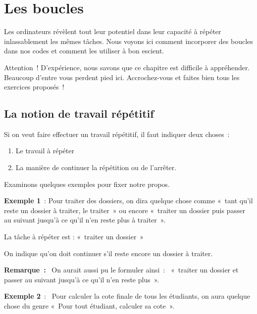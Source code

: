 \chapter{Les boucles}
\label{chap:bcl}

	Les ordinateurs révèlent tout leur potentiel dans leur capacité à
	répéter inlassablement les mêmes tâches.
	Nous voyons ici comment incorporer des boucles dans nos codes 
	et comment les utiliser à bon escient.

	Attention~! 
	D’expérience, nous savons que ce chapitre est difficile à appréhender. 
	Beaucoup d’entre vous perdent pied ici. 
	Accrochez-vous et faites bien tous les exercices proposés~!

\section{La notion de travail répétitif}

	Si on veut faire effectuer un travail répétitif, 
	il faut indiquer deux choses~:
	
	\begin{enumerate}
	\item Le travail à répéter
	\item La manière de continuer la répétition ou de l’arrêter.
	\end{enumerate}

	Examinons quelques exemples pour fixer notre propos.

	\textbf{Exemple 1}~: 
	Pour traiter des dossiers, 
	on dira quelque chose comme 
	«~tant qu’il reste un dossier à traiter, le traiter~» 
	ou encore 
	«~traiter un dossier puis passer au suivant jusqu’à ce qu’il n’en reste plus à traiter~».

	\begin{liste}
	\item La tâche à répéter est : «~traiter un dossier~»
	\item On indique qu’on doit continuer s’il reste encore un dossier à traiter.
	\end{liste}

	\textbf{Remarque~:}~
	On aurait aussi pu le formuler ainsi~:~
	«~traiter un dossier et passer au suivant jusqu’à ce qu’il n’en reste plus~».

	\textbf{Exemple 2}~:~
	Pour calculer la cote finale de tous les étudiants,
	on aura quelque chose du genre 
	«~Pour tout étudiant, calculer sa cote~».


